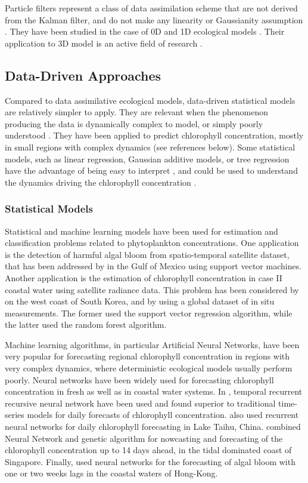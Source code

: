 Particle filters represent a class of data assimilation scheme that are not
derived from the Kalman filter, and do not make any linearity or Gaussianity
assumption \citep{Edwards2015}. They have been studied in the case of 0D and 1D
ecological models \citep{Edwards2015}.  Their application to 3D model is an
active field of research \citep{Edwards2015}.


\subsection{Data-Driven Approaches}

Compared to data assimilative ecological models, data-driven statistical models
are relatively simpler to apply. They are relevant when the phenomenon
producing the data is dynamically complex to model, or simply poorly understood
\citep{Gareth2013}. They have been applied to predict chlorophyll
concentration, mostly in small regions with complex dynamics (see references
below). Some statistical models, such as linear regression, Gaussian additive
models, or tree regression have the advantage of being easy to interpret
\citep{Gareth2013}, and could be used to understand the dynamics driving the
chlorophyll concentration \citep{Raitsos2012}.

\subsubsection{Statistical Models}

Statistical and machine learning models have been used for estimation and
classification problems related to phytoplankton concentrations. One
application is the detection of harmful algal bloom from spatio-temporal
satellite dataset, that has been addressed by \citet{Gokaraju2011} in the Gulf
of Mexico using support vector machines. Another application is the estimation
of chlorophyll concentration in case II coastal water using satellite radiance
data. This problem has been considered by \citet{Kim2014} on the west coast of
South Korea, and by \citet{Camps-Valls2006} using a global dataset of in situ
measurements.  The former used the support vector regression algorithm, while
the latter used the random forest algorithm.

Machine learning algorithms, in particular Artificial Neural Networks, have
been very popular for forecasting regional chlorophyll concentration in regions
with very complex dynamics, where deterministic ecological models usually
perform poorly.  Neural networks have been widely used for forecasting
chlorophyll concentration in fresh as well as in coastal water systems. In
\citet{Jeong2006}, temporal recurrent recursive neural network have been used
and found superior to traditional time-series models for daily forecasts of
chlorophyll concentration.  \citet{Wang2013} also used recurrent neural
networks for daily chlorophyll forecasting in Lake Taihu, China.
\citet{Mulia2013} combined Neural Network and genetic algorithm for nowcasting
and forecasting of the chlorophyll concentration up to 14 days ahead, in the
tidal dominated coast of Singapore.  Finally, \citet{Lee2003} used neural
networks for the forecasting of algal bloom with one or two weeks lags in the
coastal waters of Hong-Kong.

